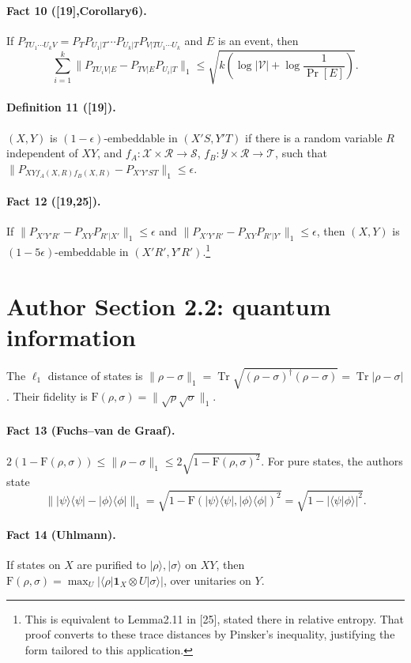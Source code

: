 \documentclass[10pt,a4paper]{article}
\providecommand{\ket}[1]{\lvert#1\rangle}
\providecommand{\bra}[1]{\langle#1\rvert}
\providecommand{\proj}[1]{\ket{#1}\bra{#1}}
\providecommand{\Id}[1]{\mathbf1_{#1}}
\begin{document}
\paragraph{Fact 10 ([19],Corollary6).} If $P_{TU_1\cdots U_kV}=P_TP_{U_1|T}\cdots P_{U_k|T}P_{V|TU_1\cdots U_k}$ and $E$ is an event, then
\[\sum_{i=1}^k\|P_{TU_iV|E}-P_{TV|E}P_{U_i|T}\|_1\le\sqrt{k\left(\log|\mathcal V|+\log\frac1{\Pr[E]}\right)}.\]
\paragraph{Definition 11 ([19]).} $(X,Y)$ is $(1-\epsilon)$-embeddable in $(X'S,Y'T)$ if there is a random variable $R$ independent of $XY$, and $f_A:\mathcal X\times\mathcal R\to\mathcal S$, $f_B:\mathcal Y\times\mathcal R\to\mathcal T$, such that $\|P_{XYf_A(X,R)f_B(X,R)}-P_{X'Y'ST}\|_1\le\epsilon$.
\paragraph{Fact 12 ([19,25]).} If $\|P_{X'Y'R'}-P_{XY}P_{R'|X'}\|_1\le\epsilon$ and $\|P_{X'Y'R'}-P_{XY}P_{R'|Y'}\|_1\le\epsilon$, then $(X,Y)$ is $(1-5\epsilon)$-embeddable in $(X'R',Y'R')$.\footnote{This is equivalent to Lemma2.11 in [25], stated there in relative entropy. That proof converts to these trace distances by Pinsker's inequality, justifying the form tailored to this application.}

\section*{Author Section 2.2: quantum information}
The $\ell_1$ distance of states is $\|\rho-\sigma\|_1=\operatorname{Tr}\sqrt{(\rho-\sigma)^\dagger(\rho-\sigma)}=\operatorname{Tr}|\rho-\sigma|$. Their fidelity is $\mathrm F(\rho,\sigma)=\|\sqrt\rho\sqrt\sigma\|_1$.
\paragraph{Fact 13 (Fuchs--van de Graaf).} $2(1-\mathrm F(\rho,\sigma))\le\|\rho-\sigma\|_1\le2\sqrt{1-\mathrm F(\rho,\sigma)^2}$. For pure states, the authors state
\[\|\proj\psi-\proj\phi\|_1=\sqrt{1-\mathrm F(\proj\psi,\proj\phi)^2}=\sqrt{1-|\langle\psi|\phi\rangle|^2}.\]
\paragraph{Fact 14 (Uhlmann).} If states on $X$ are purified to $\ket\rho,\ket\sigma$ on $XY$, then $\mathrm F(\rho,\sigma)=\max_U|\bra\rho\Id X\otimes U\ket\sigma|$, over unitaries on $Y$.
\end{document}

